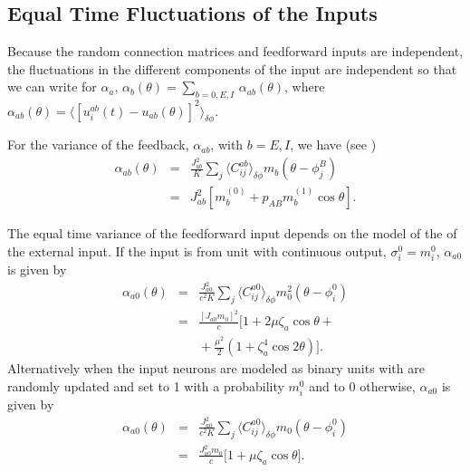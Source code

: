 \subsection{Equal Time Fluctuations of the Inputs}
Because the random connection matrices and feedforward inputs 
are independent, the fluctuations in the different components of the 
input are independent so that we can write for $\alpha_a$,
$\alpha_b(\theta)=\sum_{b=0,E,I}\,\alpha_{ab}(\theta)$,
where $\alpha_{ab}(\theta)=
\langle [u_i^{ab}(t)-u_{ab}(\theta)]^2\rangle_{\delta\phi}$\@.

For the variance of the feedback, $\alpha_{ab}$, with $b=E,I$, we have
(see \cite{vanVreeswijk2005})
\begin{eqnarray} 
\alpha_{ab}(\theta) & = &\frac{J_{ab}^2}{K}\sum_j
\langle C^{ab}_{ij}\rangle_{\delta\phi} m_b(\theta-\phi_j^B)
\nonumber \\
 & = & J_{ab}^2[m_b^{(0)}+p_{AB}m_b^{(1)}\cos \theta].
\label{alAB:eq}
\end{eqnarray}

The equal time variance of the feedforward input depends on the model of the 
of the external input. If the input is from unit with continuous output,
$\sigma_i^0=m_i^0$, $\alpha_{a0}$ is given by
\begin{eqnarray}  
\alpha_{a0}(\theta) & = &\frac{J_{a0}^2}{c^2K}\sum_j \langle C_{ij}^{a0}
\rangle_{\delta\phi}m_0^2(\theta-\phi_i^0) \nonumber \\
 & = & \frac{[J_{a0}m_0]^2}{c}\Big[1+2\mu\zeta_a\cos \theta+\nonumber \\
 & & \mbox{}+\frac{\mu^2}{2}(1+\zeta_a^4\cos 2\theta)\Big].
\label{alA0:eq}
\end{eqnarray}
Alternatively when the input neurons are modeled as 
binary units with  are randomly updated and set to 1 with a probability
$m_i^0$ and to 0 otherwise, $\alpha_{a0}$ is given by
\begin{eqnarray}  
\alpha_{a0}(\theta) & = &\frac{J_{a0}^2}{c^2K}\sum_j \langle C_{ij}^{a0}
\rangle_{\delta\phi}m_0(\theta-\phi_i^0) \nonumber \\
 & = & \frac{J_{a0}^2m_0}{c}\Big[1+\mu\zeta_a\cos \theta\Big].
\label{alA0a:eq}
\end{eqnarray} 


